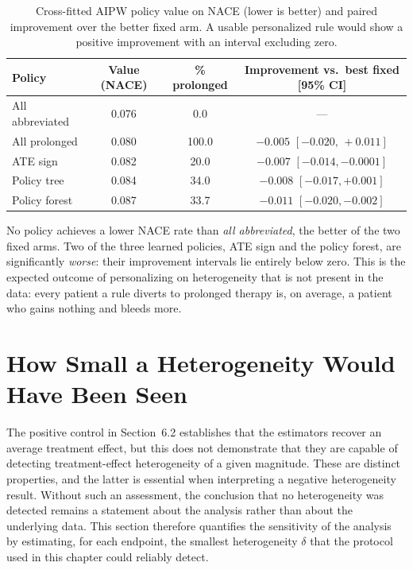 \begin{table}[H]
\centering
\caption{Cross-fitted AIPW policy value on NACE (lower is better) and paired
improvement over the better fixed arm. A usable personalized rule would show a
positive improvement with an interval excluding zero.}
\label{tab:policy-value}
\small
\begin{tabular}{lccc}
\toprule
Policy & Value (NACE) & \% prolonged & Improvement vs.\ best fixed [95\% CI] \\
\midrule
All abbreviated   & 0.076 & 0.0   & --- \\
All prolonged     & 0.080 & 100.0 & $-0.005$ $[-0.020,\,+0.011]$ \\
ATE sign          & 0.082 & 20.0  & $-0.007$ $[-0.014, -0.0001]$ \\
Policy tree       & 0.084 & 34.0  & $-0.008$ $[-0.017, +0.001]$ \\
Policy forest     & 0.087 & 33.7  & $-0.011$ $[-0.020, -0.002]$ \\
\bottomrule
\end{tabular}
\end{table}

No policy achieves a lower NACE rate than \emph{all abbreviated}, the better
of the two fixed arms. Two of the three learned policies, ATE sign and the
policy forest, are significantly \emph{worse}: their improvement intervals
lie entirely below zero. This is the expected outcome of personalizing on
heterogeneity that is not present in the data: every patient a rule diverts to
prolonged therapy is, on average, a patient who gains nothing and bleeds
more.

\section{How Small a Heterogeneity Would Have Been Seen}
\label{sec:delta}

The positive control in Section~6.2 establishes that the estimators recover an
average treatment effect, but this does not demonstrate that they are capable
of detecting treatment-effect heterogeneity of a given magnitude. These are
distinct properties, and the latter is essential when interpreting a negative
heterogeneity result. Without such an assessment, the conclusion that no
heterogeneity was detected remains a statement about the analysis rather than
about the underlying data. This section therefore quantifies the sensitivity
of the analysis by estimating, for each endpoint, the smallest heterogeneity
$\delta$ that the protocol used in this chapter could reliably detect.

